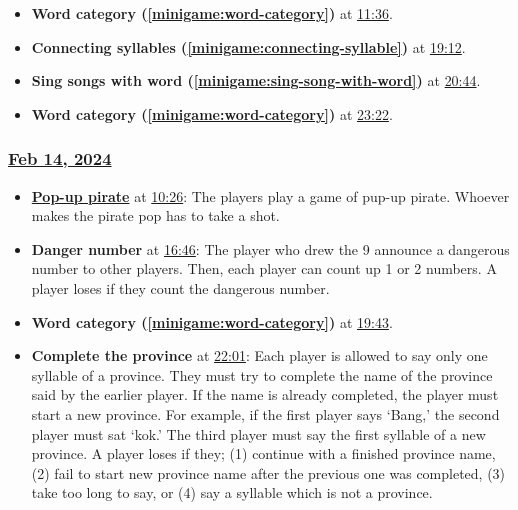 \documentclass{article}
\begin{document}
\begin{itemize}
    \item \textbf{Word category (\ref{minigame:word-category})} at \href{https://youtu.be/4FlOWGefcI0?t=696}{11:36}.
    \item \textbf{Connecting syllables (\ref{minigame:connecting-syllable})} at \href{https://youtu.be/4FlOWGefcI0?t=1152}{19:12}.
    \item \textbf{Sing songs with word (\ref{minigame:sing-song-with-word})} at \href{https://youtu.be/4FlOWGefcI0?t=1244}{20:44}.
    \item \textbf{Word category (\ref{minigame:word-category})} at \href{https://youtu.be/4FlOWGefcI0?t=1402}{23:22}.
\end{itemize}

\subsubsection{\href{https://youtu.be/EaozS-f_sIM}{Feb 14, 2024}}

\begin{itemize}
    \item \textbf{\href{https://en.wikipedia.org/wiki/Pop-up_Pirate}{Pop-up pirate}} at \href{https://youtu.be/EaozS-f_sIM?t=626}{10:26}: The players play a game of pup-up pirate. Whoever makes the pirate pop has to take a shot. \label{minigame:popup-pirate}
    \item \textbf{Danger number} at \href{https://youtu.be/EaozS-f_sIM?t=1006}{16:46}: The player who drew the 9 announce a dangerous number to other players. Then, each player can count up 1 or 2 numbers. A player loses if they count the dangerous number. \label{minigame:danger-number}
    \item \textbf{Word category (\ref{minigame:word-category})} at \href{https://youtu.be/EaozS-f_sIM?t=1183}{19:43}.
    \item \textbf{Complete the province} at \href{https://youtu.be/EaozS-f_sIM?t=1321}{22:01}: Each player is allowed to say only one syllable of a province. They must try to complete the name of the province said by the earlier player. If the name is already completed, the player must start a new province. For example, if the first player says `Bang,' the second player must sat `kok.' The third player must say the first syllable of a new province. A player loses if they; (1) continue with a finished province name, (2) fail to start new province name after the previous one was completed, (3) take too long to say, or (4) say a syllable which is not a province. \label{minigame:complete-the-province}
\end{itemize}
\end{document}
